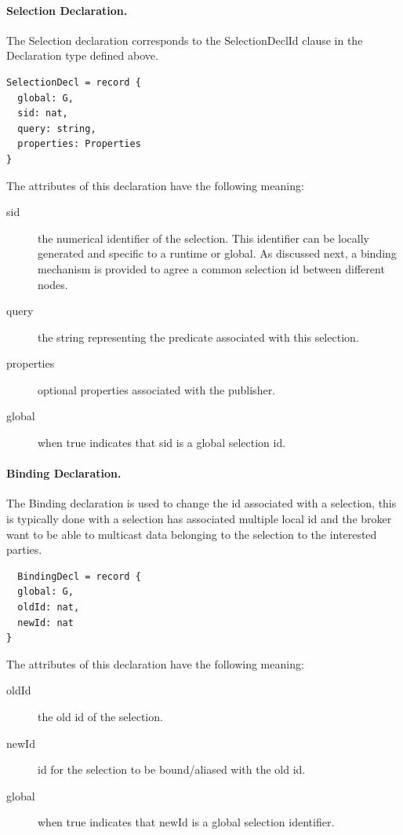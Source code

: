 \documentclass[a4paper,oneside,article]{memoir}
\begin{document}
\paragraph{Selection Declaration.} The Selection declaration corresponds to the SelectionDeclId
clause in the Declaration type defined above.
\begin{verbatim}
SelectionDecl = record {
  global: G,
  sid: nat,
  query: string,
  properties: Properties
}  
\end{verbatim}

The attributes of this declaration have the following meaning:
\begin{description}
\item[sid] the numerical identifier of the selection.  This identifier can be locally generated and
  specific to a runtime or global.  As discussed next, a binding mechanism is provided to agree a
  common selection id between different nodes.
\item[query] the string representing the predicate associated with this selection.
\item[properties] optional properties associated with the publisher.
\item[global] when true indicates that sid is a global selection id.
\end{description}

\paragraph{Binding Declaration.} The Binding declaration is used to change the id associated with a
selection, this is typically done with a selection has associated multiple local id and the broker
want to be able to multicast data belonging to the selection to the interested parties.
\begin{verbatim}
  BindingDecl = record {
  global: G,
  oldId: nat,
  newId: nat
}
\end{verbatim}

The attributes of this declaration have the following meaning:
\begin{description}
\item[oldId] the old id of the selection.
\item[newId] id for the selection to be bound/aliased with the old id.
\item[global] when true indicates that newId is a global selection identifier.
\end{description}
\end{document}
